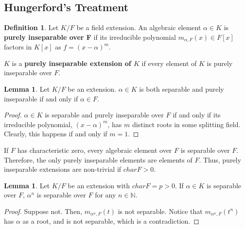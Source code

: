 \documentclass{article}
\theoremstyle{definition}
\newtheorem{definition}{Definition}
\newtheorem{lemma}[theorem]{Lemma}
\newcommand{\N}{\mathbb{N}}
\begin{document}
\subsection{Hungerford's Treatment}

\begin{definition}\label{purely_inseparable_extensions}
    Let $K/F$ be a field extension. An algebraic element $\alpha \in K$ is \textbf{purely inseparable over F}
    if its irreducible polynomial $m_{\alpha, F}(x) \in F[x]$ factors in $K[x]$ as $f = (x - \alpha)^{m}$.

    $K$ is a \textbf{purely inseparable extension of $K$} if every element of $K$ is purely inseparable
    over $F$.
\end{definition}

\begin{lemma}\label{there_are_no_nontrivial_separable_and_inseparable_elements}
    Let $K/F$ be an extension. $\alpha \in K$ is both separable and purely inseparable
    if and only if $\alpha \in F$.
\end{lemma}
\begin{proof}
    $\alpha \in K$ is separable and purely inseparable over $F$ if and only if 
    its irreducible polynomial, $(x - \alpha)^{m}$, has $m$ distinct roots
    in some splitting field. Clearly, this happens if and only if $m = 1$.
\end{proof}

If $F$ has characteristic zero, every algebraic element over $F$ is separable over $F$.
Therefore, the only purely inseparable elements are elements of $F$. Thus, purely inseparable
extensions are non-trivial if $charF > 0$.

\begin{lemma}\label{alpha_separable_implies_all_powers_are_separable}
    Let $K/F$ be an extension with $charF = p > 0$. If $\alpha \in K$
    is separable over $F$, $\alpha^{n}$ is separable over $F$
    for any $n \in \N$.
\end{lemma}
\begin{proof}
    Suppose not. Then, $m_{\alpha^{n}, F}(t)$ is not separable.
    Notice that $m_{\alpha^{n},F}(t^{n})$ has $\alpha$ as a root,
    and is not separable, which is a contradiction.
\end{proof}
\end{document}
